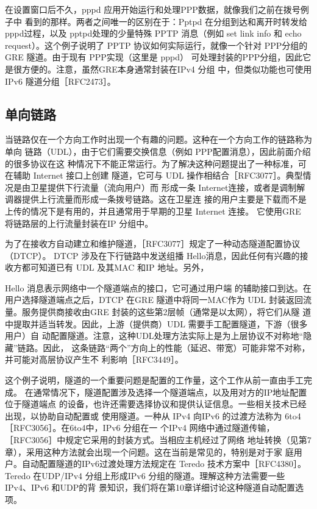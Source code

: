 在设置窗口后不久，pppd 应用开始运行和处理PPP数据，就像我们之前在拨号例子中
看到的那样。两者之间唯一的区别在于：Pptpd 在分组到达和离开时转发给 pppd过程，以及
pptpd处理的少量特殊 PPTP 消息（例如 set link info 和 echo request）。这个例子说明了 PPTP
协议如何实际运行，就像一个针对 PPP分组的GRE 隧道。由于现有 PPP实现（这里是 pppd）
可处理封装的PPP分组，因此它是很方便的。注意，虽然GRE本身通常封装在IPv4 分组
中，但类似功能也可使用IPv6 隧道分组［RFC2473］。

\subsection{单向链路}

当链路仅在一个方向工作时出现一个有趣的问题。这种在一个方向工作的链路称为单向
链路（UDL），由于它们需要交换信息（例如 PPP配置消息），因此前面介绍的很多协议在这
种情况下不能正常运行。为了解决这种问题提出了一种标准，可在辅助 Internet 接口上创建
隧道，它可与 UDL 操作相结合［RFC3077］。典型情况是由卫星提供下行流量（流向用户）而
形成一条 Internet连接，或者是调制解调器提供上行流量而形成一条拨号链路。这在卫星连
接的用户主要是下载而不是上传的情况下是有用的，并且通常用于早期的卫星 Internet 连接。
它使用GRE 将链路层的上行流量封装在IP 分组中。

为了在接收方自动建立和维护隧道，［RFC3077］规定了一种动态隧道配置协议（DTCP）。
DTCP 涉及在下行链路中发送组播 Hello消息，因此任何有兴趣的接收方都可知道已有 UDL
及其MAC 和IP 地址。另外，

Hello 消息表示网络中一个隧道端点的接口，它可通过用户端
的辅助接口到达。在用户选择隧道端点之后，DTCP 在GRE 隧道中将同一MAC作为 UDL
封装返回流量。服务提供商接收由GRE 封装的这些第2层帧（通常是以太网），将它们从隧
道中提取并适当转发。因此，上游（提供商）UDL 需要手工配置隧道，下游（很多用户）自
动配置隧道。注意，这种UDL处理方法实际上是为上层协议不对称地“隐藏”链路。因此，
这条链路“两个”方向上的性能（延迟、带宽）可能非常不对称，并可能对高层协议产生不
利影响［RFC3449］。

这个例子说明，隧道的一个重要问题是配置的工作量，这个工作从前一直由手工完成。
在通常情况下，隧道配置涉及选择一个隧道端点，以及用对方的IP地址配置位于隧道端点
的设备，也许还需要选择协议和提供认证信息。一些相关技术已经出现，以协助自动配置或
使用隧道。一种从 IPv4 向IPv6 的过渡方法称为 6to4 ［RFC3056］。在6to4中，IPv6 分组在一
个IPv4 网络中通过隧道传输，［RFC3056］中规定它采用的封装方式。当相应主机经过了网络
地址转换（见第7章），采用这种方法就会出现一个问题。这在当前是常见的，特别是对于家
庭用户。自动配置隧道的IPv6过渡处理方法规定在 Teredo 技术方案中［RFC4380］。Teredo
在UDP/IPv4 分组上形成IPv6 分组的隧道。理解这种方法需要一些 IPv4、IPv6 和UDP的背
景知识，我们将在第10章详细讨论这种隧道自动配置选项。

